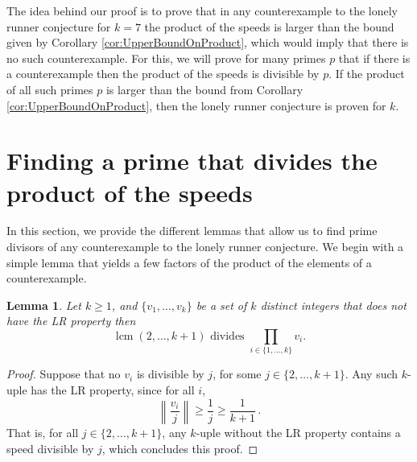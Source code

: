 \documentclass[11pt,a4paper]{article}
\newtheorem{lemma}[theorem]{Lemma}
\theoremstyle{definition}
\theoremstyle{remark}
\DeclareMathOperator{\lcm}{lcm}
\begin{document}
The idea behind our proof is to prove that in any counterexample to the lonely runner conjecture for $k=7$ the product of the speeds is larger than the bound given by Corollary \ref{cor:UpperBoundOnProduct}, which would imply that there is no such counterexample. For this, we will prove for many primes $p$ that if there is a counterexample then the product of the speeds is divisible by $p$. If the product of all such primes $p$ is larger than the bound from Corollary \ref{cor:UpperBoundOnProduct}, then the lonely runner conjecture is proven for $k$.


\section{Finding a prime that divides the product of the speeds}
In this section, we provide the different lemmas that allow us to find prime divisors of any counterexample to the lonely runner conjecture. We begin with a simple lemma that yields a few factors of the product of the elements of a counterexample.
\begin{lemma}\label{smalldivisors}
  Let $k \geq 1$, and $\{v_1, \ldots, v_k\}$ be a set of $k$ distinct integers that does not have the LR property then
  \[
 \lcm(2,\ldots,k+1) \text{ divides } \prod_{i\in \{1,\ldots, k\}}v_i.
  \]
\end{lemma}
\begin{proof}
Suppose that no $v_i$ is divisible by $j$, for some $j\in \{2,\ldots,k+1\}$. Any such $k$-uple has the LR property, since for all $i$, 
\[
\left\|\frac{v_i}{j}\right\|\ge \frac{1}{j}\ge\frac{1}{k+1}\,.
\] 
That is, for all $j\in \{2,\ldots,k+1\}$, any $k$-uple without the LR property contains a speed divisible by $j$, which concludes this proof.
\end{proof}
\end{document}
